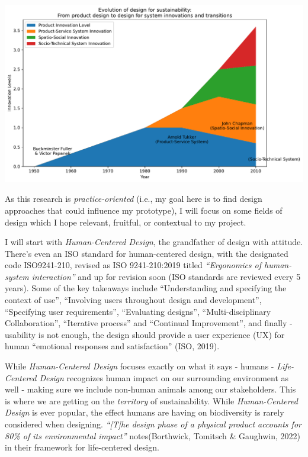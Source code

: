 \documentclass[
  letterpaper,
  DIV=11,
  numbers=noendperiod]{scrartcl}
\begin{document}
\includegraphics{_thesis_files/figure-pdf/cell-21-output-1.pdf}

As this research is \emph{practice-oriented} (i.e., my goal here is to
find design approaches that could influence my prototype), I will focus
on some fields of design which I hope relevant, fruitful, or contextual
to my project.

I will start with \emph{Human-Centered Design}, the grandfather of
design with attitude. There's even an ISO standard for human-centered
design, with the designated code ISO9241-210, revised as ISO
9241-210:2019 titled \emph{``Ergonomics of human-system interaction''}
and up for revision soon (ISO standards are reviewed every 5 years).
Some of the key takeaways include ``Understanding and specifying the
context of use'', ``Involving users throughout design and development'',
``Specifying user requirements'', ``Evaluating designs'',
``Multi-disciplinary Collaboration'', ``Iterative process'' and
``Continual Improvement'', and finally - usability is not enough, the
design should provide a user experience (UX) for human ``emotional
responses and satisfaction'' (ISO, 2019).

While \emph{Human-Centered Design} focuses exactly on what it says -
humans - \emph{Life-Centered Design} recognizes human impact on our
surrounding environment as well - making sure we include non-human
animals among our stakeholders. This is where we are getting on the
\emph{territory} of sustainability. While \emph{Human-Centered Design}
is ever popular, the effect humans are having on biodiversity is rarely
considered when designing. \emph{``{[}T{]}he design phase of a physical
product accounts for 80\% of its environmental impact''}
notes(Borthwick, Tomitsch \& Gaughwin, 2022) in their framework for
life-centered design.
\end{document}
